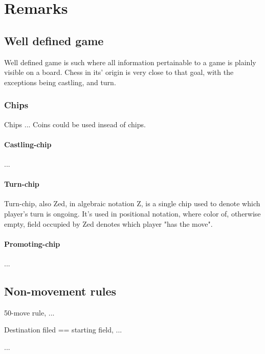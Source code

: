 

\chapter*{Remarks}
\label{ch:Remarks}

\section*{Well defined game}
\label{sec:Remarks/Well defined game}

Well defined game is such where all information pertainable to a game
is plainly visible on a board. Chess in its' origin is very close to
that goal, with the exceptions being castling, and turn.

\subsection*{Chips}
\label{sec:Remarks/Chips}
Chips ...
Coins could be used insead of chips.

\subsubsection*{Castling-chip}
\label{sec:Remarks/Chips/Castling-chip}
...

\subsubsection*{Turn-chip}
\label{sec:Remarks/Chips/Turn-chip}
Turn-chip, also Zed, in algebraic notation Z, is a single chip used to
denote which player's turn is ongoing. It's used in positional notation,
where color of, otherwise empty, field occupied by Zed denotes which
player "has the move".

\subsubsection*{Promoting-chip}
\label{sec:Remarks/Chips/Promoting-chip}
...

\section*{Non-movement rules}
\label{sec:Remarks/Non-movement rules}

50-move rule, ...

Destination filed == starting field, ...

...

\clearpage %
